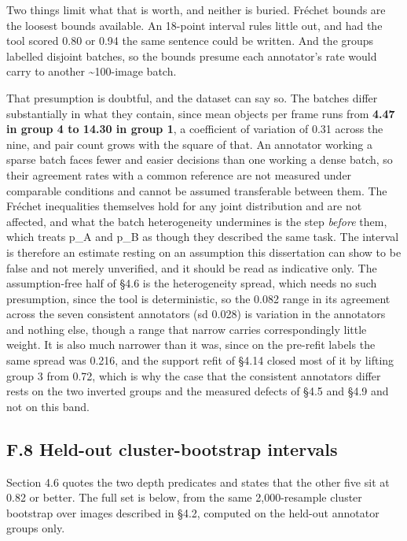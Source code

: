 Two things limit what that is worth, and neither is buried. Fréchet bounds are the loosest bounds available. An 18-point interval rules little out, and had the tool scored 0.80 or 0.94 the same sentence could be written. And the groups labelled disjoint batches, so the bounds presume each annotator's rate would carry to another \textasciitilde{}100-image batch.

That presumption is doubtful, and the dataset can say so. The batches differ substantially in what they contain, since mean objects per frame runs from \textbf{4.47 in group 4 to 14.30 in group 1}, a coefficient of variation of 0.31 across the nine, and pair count grows with the square of that. An annotator working a sparse batch faces fewer and easier decisions than one working a dense batch, so their agreement rates with a common reference are not measured under comparable conditions and cannot be assumed transferable between them. The Fréchet inequalities themselves hold for any joint distribution and are not affected, and what the batch heterogeneity undermines is the step \textit{before} them, which treats p\_\allowbreak{}A and p\_\allowbreak{}B as though they described the same task. The interval is therefore an estimate resting on an assumption this dissertation can show to be false and not merely unverified, and it should be read as indicative only. The assumption-free half of \S{}4.6 is the heterogeneity spread, which needs no such presumption, since the tool is deterministic, so the 0.082 range in its agreement across the seven consistent annotators (sd 0.028) is variation in the annotators and nothing else, though a range that narrow carries correspondingly little weight. It is also much narrower than it was, since on the pre-refit labels the same spread was 0.216, and the support refit of \S{}4.14 closed most of it by lifting group 3 from 0.72, which is why the case that the consistent annotators differ rests on the two inverted groups and the measured defects of \S{}4.5 and \S{}4.9 and not on this band.

\subsection{F.8 Held-out cluster-bootstrap intervals}

Section 4.6 quotes the two depth predicates and states that the other five sit at 0.82 or better. The full set is below, from the same 2,000-resample cluster bootstrap over images described in \S{}4.2, computed on the held-out annotator groups only.

